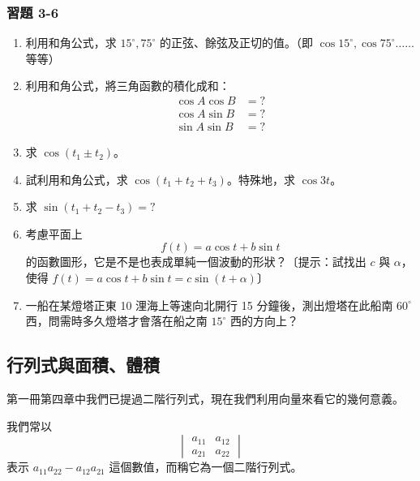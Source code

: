 \subsubsection*{習題 3-6}

\begin{enumerate}[label=\arabic*., leftmargin=2em]
  \item 利用和角公式，求 $15^\circ, 75^\circ$ 的正弦、餘弦及正切的值。（即 $\cos 15^\circ, \cos 75^\circ \dots\dots$ 等等）
  \item 利用和角公式，將三角函數的積化成和：
  \begin{align*}
  \cos A\cos B &= ? \\
  \cos A\sin B &= ? \\
  \sin A\sin B &= ?
  \end{align*}
  \item 求 $\cos(t_1 \pm t_2)$。
  \item 試利用和角公式，求 $\cos(t_1 + t_2 + t_3)$。特殊地，求 $\cos 3t$。
  \item 求 $\sin(t_1 + t_2 - t_3) = ?$
  \item 考慮平面上
  \[ f(t) = a\cos t + b\sin t \]
  的函數圖形，它是不是也表成單純一個波動的形狀？〔提示：試找出 $c$ 與 $\alpha$，使得 $f(t) = a\cos t + b\sin t = c\sin(t + \alpha)$〕
  \item[\textbf{*7.}] 一船在某燈塔正東 10 浬海上等速向北開行 15 分鐘後，測出燈塔在此船南 $60^\circ$ 西，問需時多久燈塔才會落在船之南 $15^\circ$ 西的方向上？
\end{enumerate}

\subsection{行列式與面積、體積}
\label{sec:b3s-3-7}

第一冊第四章中我們已提過二階行列式，現在我們利用向量來看它的幾何意義。

\begin{definition}
我們常以
\[ \begin{vmatrix} a_{11} & a_{12} \\ a_{21} & a_{22} \end{vmatrix} \]
表示 $a_{11}a_{22} - a_{12}a_{21}$ 這個數值，而稱它為一個二階行列式。
\end{definition}

